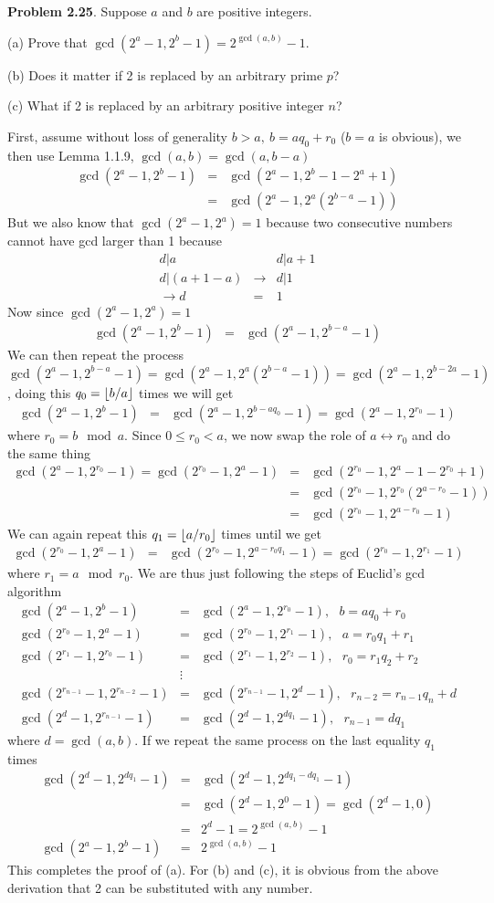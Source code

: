 \documentclass[aps,preprint,preprintnumbers,nofootinbib,showpacs,prd]{revtex4-1}
\newcommand{\nbea}{\begin{eqnarray*}}
\newcommand{\neea}{\end{eqnarray*}}
\DeclarePairedDelimiter{\floor}{\lfloor}{\rfloor}
\begin{document}
{\bf Problem 2.25}. Suppose $a$ and $b$ are positive integers.

(a) Prove that $\gcd(2^a - 1, 2^b - 1) = 2^{\gcd(a,b)} - 1$.

(b) Does it matter if 2 is replaced by an arbitrary prime $p$?

(c) What if 2 is replaced by an arbitrary positive integer $n$?

First, assume without loss of generality $b > a, ~ b = aq_0 + r_0$ ($b=a$ is obvious), we then use Lemma 1.1.9, $\gcd(a,b) = \gcd(a,b-a)$
%
\nbea
\gcd(2^a - 1, 2^b - 1) & = & \gcd(2^a - 1, 2^b - 1 - 2^a + 1) \\
& = & \gcd(2^a - 1, 2^a(2^{b-a} - 1))
\neea
%
But we also know that $\gcd(2^a - 1, 2^a)=1$ because two consecutive numbers cannot have gcd larger than 1 because
%
\nbea
d|a & & d|a+1 \\
d|(a+1-a)& \to & d|1 \\
\to d & = & 1
\neea
%
Now since $\gcd(2^a - 1, 2^a)=1$
%
\nbea
\gcd(2^a - 1, 2^b - 1) & = & \gcd(2^a - 1,2^{b-a} - 1)
\neea
%
We can then repeat the process $\gcd(2^a - 1,2^{b-a} - 1) = \gcd(2^a - 1,2^a(2^{b-a} - 1)) = \gcd(2^a - 1, 2^{b-2a}-1)$, doing this $q_0 = \floor{b/a}$ times we will get
%
\nbea
\gcd(2^a - 1, 2^b - 1) & = & \gcd(2^a - 1, 2^{b- aq_0} - 1) = \gcd(2^a - 1, 2^{r_0} - 1)
\neea
%
where $r_0 = b \mod a$. Since $0 \le r_0 < a$, we now swap the role of $a \leftrightarrow r_0$ and do the same thing
%
\nbea
\gcd(2^a - 1, 2^{r_0} - 1) = \gcd(2^{r_0} - 1, 2^a - 1) & = & \gcd(2^{r_0} - 1, 2^a - 1 - 2^{r_0} + 1) \\
& = & \gcd(2^{r_0} - 1, 2^{r_0}(2^{a - r_0} - 1)) \\
& = & \gcd(2^{r_0} - 1, 2^{a - r_0} - 1)
\neea
%
We can again repeat this $q_1 = \floor{a/r_0}$ times until we get
%
\nbea
\gcd(2^{r_0} - 1, 2^a - 1) & = & \gcd(2^{r_0} - 1, 2^{a - r_0q_1} - 1) = \gcd(2^{r_0} - 1, 2^{r_1} - 1)
\neea
%
where $r_1 = a \mod r_0$. We are thus just following the steps of Euclid's gcd algorithm
%
\nbea
\gcd(2^a - 1, 2^b - 1) & = & \gcd(2^a - 1, 2^{r_0} - 1), ~~~b = aq_0 + r_0 \\
\gcd(2^{r_0} - 1, 2^a - 1) & = & \gcd(2^{r_0} - 1, 2^{r_1} - 1), ~~~a = r_0q_1 + r_1 \\
\gcd(2^{r_1} - 1, 2^{r_0} - 1) & = & \gcd(2^{r_1} - 1, 2^{r_2} - 1), ~~~r_0 = r_1q_2 + r_2 \\
& \vdots & \\
\gcd(2^{r_{n-1}} - 1, 2^{r_{n-2}} - 1) & = & \gcd(2^{r_{n-1}} - 1, 2^{d} - 1), ~~~r_{n-2} = r_{n-1}q_n + d \\
\gcd(2^{d} - 1, 2^{r_{n-1}} - 1) & = & \gcd(2^{d} - 1, 2^{dq_1} - 1), ~~~r_{n-1} = dq_1
\neea
%
where $d = \gcd(a,b)$. If we repeat the same process on the last equality $q_1$ times
%
\nbea
\gcd(2^{d} - 1, 2^{dq_1} - 1) & = & \gcd(2^{d} - 1, 2^{dq_1-dq_1} - 1) \\
& = & \gcd(2^{d} - 1, 2^0 - 1) = \gcd(2^{d} - 1, 0) \\
& = &  2^{d} - 1 = 2^{\gcd(a,b)} - 1\\
\gcd(2^a - 1, 2^b - 1) & = & 2^{\gcd(a,b)} - 1
\neea
%
This completes the proof of (a). For (b) and (c), it is obvious from the above derivation that 2 can be substituted with any number.
\end{document}
